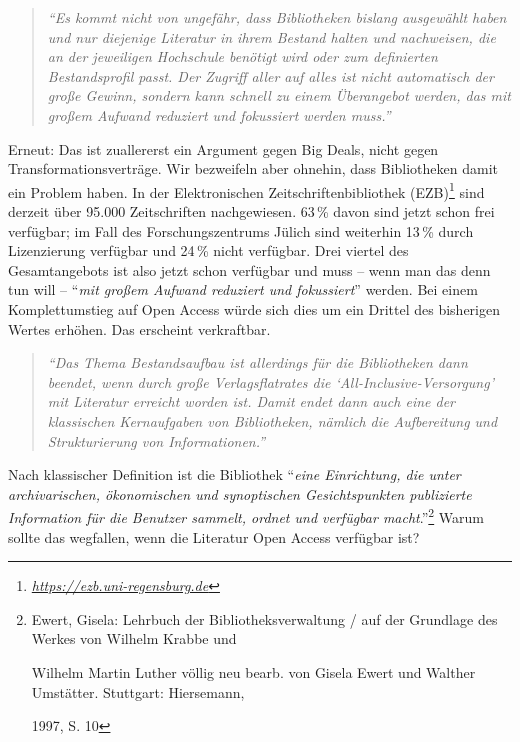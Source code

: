 \documentclass[a4paper,
fontsize=11pt,
oneside,
numbers=noperiodatend,
parskip=half-,
bibliography=totoc,
final
]{scrartcl}
\begin{document}
\begin{quote}
\emph{\enquote{Es kommt nicht von ungefähr, dass Bibliotheken bislang
ausgewählt haben und nur diejenige Literatur in ihrem Bestand halten und
nachweisen, die an der jeweiligen Hochschule benötigt wird oder zum
definierten Bestandsprofil passt. Der Zugriff aller auf alles ist nicht
automatisch der große Gewinn, sondern kann schnell zu einem Überangebot
werden, das mit großem Aufwand reduziert und fokussiert werden muss.}}
\end{quote}

Erneut: Das ist zuallererst ein Argument gegen Big Deals, nicht gegen
Transformationsverträge. Wir bezweifeln aber ohnehin, dass Bibliotheken
damit ein Problem haben. In der Elektronischen Zeitschriftenbibliothek
(EZB)\footnote{\href{https://ezb.uni-regensburg.de}{\emph{https://ezb.uni-regensburg.de}}}
sind derzeit über 95.000 Zeitschriften nachgewiesen. 63\,\% davon sind
jetzt schon frei verfügbar; im Fall des Forschungszentrums Jülich sind
weiterhin 13\,\% durch Lizenzierung verfügbar und 24\,\% nicht
verfügbar. Drei viertel des Gesamtangebots ist also jetzt schon
verfügbar und muss -- wenn man das denn tun will -- \enquote{\emph{mit
großem Aufwand reduziert und fokussiert}} werden. Bei einem
Komplettumstieg auf Open Access würde sich dies um ein Drittel des
bisherigen Wertes erhöhen. Das erscheint verkraftbar.

\begin{quote}
\emph{\enquote{Das Thema Bestandsaufbau ist allerdings für die
Bibliotheken dann beendet, wenn durch große Verlagsflatrates die
\enquote{All-Inclusive-Versorgung} mit Literatur erreicht worden ist.
Damit endet dann auch eine der klassischen Kernaufgaben von
Bibliotheken, nämlich die Aufbereitung und Strukturierung von
Informationen.}}
\end{quote}

Nach klassischer Definition ist die Bibliothek \enquote{\emph{eine
Einrichtung, die unter archivarischen, ökonomischen und synoptischen
Gesichtspunkten publizierte Information für die Benutzer sammelt, ordnet
und verfügbar macht}.}\footnote{Ewert, Gisela: Lehrbuch der
  Bibliotheksverwaltung / auf der Grundlage des Werkes von Wilhelm
  Krabbe und

  Wilhelm Martin Luther völlig neu bearb. von Gisela Ewert und Walther
  Umstätter. Stuttgart: Hiersemann,

  1997, S. 10} Warum sollte das wegfallen, wenn die Literatur Open
Access verfügbar ist?
\end{document}
